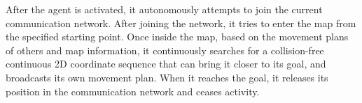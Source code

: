 After the agent is activated, it autonomously attempts to join the current communication network. 
After joining the network, it tries to enter the map from the specified starting point. 
Once inside the map, based on the movement plans of others and map information, it continuously searches for a collision-free continuous 2D coordinate sequence that can bring it closer to its goal, and broadcasts its own movement plan. 
When it reaches the goal, it releases its position in the communication network and ceases activity.







